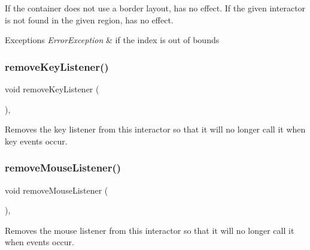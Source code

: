 If the container does not use a border layout, has no effect. If the given interactor is not found in the given region, has no effect. 
\begin{DoxyExceptions}{Exceptions}
{\em Error\+Exception} & if the index is out of bounds \\
\hline
\end{DoxyExceptions}
\mbox{\label{classGInteractor_a43095f41cab3be732b49f29970484b05}} 
\subsubsection{\texorpdfstring{remove\+Key\+Listener()}{removeKeyListener()}}
{\footnotesize\ttfamily void remove\+Key\+Listener (\begin{DoxyParamCaption}{ }\end{DoxyParamCaption})\hspace{0.3cm}{\ttfamily [virtual]}, {\ttfamily [inherited]}}



Removes the key listener from this interactor so that it will no longer call it when key events occur. 

\mbox{\label{classGInteractor_aff47f71ce47e688a07c9d38dc92fcc11}} 
\subsubsection{\texorpdfstring{remove\+Mouse\+Listener()}{removeMouseListener()}}
{\footnotesize\ttfamily void remove\+Mouse\+Listener (\begin{DoxyParamCaption}{ }\end{DoxyParamCaption})\hspace{0.3cm}{\ttfamily [virtual]}, {\ttfamily [inherited]}}



Removes the mouse listener from this interactor so that it will no longer call it when events occur. 

\mbox{\label{classGInteractor_a519fb2ac767f8b2febbb50b898b8c8cb}} 
